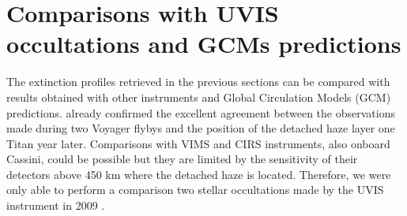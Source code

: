 \section{Comparisons with UVIS occultations and GCMs predictions}

The extinction profiles retrieved in the previous sections can be compared with results
obtained with other instruments and Global Circulation Models (GCM) predictions.
\cite{West2018} already confirmed the excellent agreement between the observations made during
two Voyager flybys and the position of the detached haze layer one Titan year later.
Comparisons with VIMS and CIRS instruments, also onboard Cassini, could be possible but
they are limited by the sensitivity of their detectors above 450 km where the detached haze is located.
Therefore, we were only able to perform a comparison two stellar occultations
made by the UVIS instrument in 2009 \citep{Koskinen2011}.

